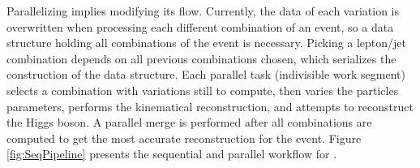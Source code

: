 Parallelizing \ttDilepKinFit implies modifying its flow. Currently, the data of each variation is overwritten when processing each different combination of an event, so a data structure holding all combinations of the event is necessary. Picking a lepton/jet combination depends on all previous combinations chosen, which serializes the construction of the data structure. Each parallel task (indivisible work segment) selects a combination with variations still to compute, then varies the particles parameters, performs the kinematical reconstruction, and attempts to reconstruct the Higgs boson. A parallel merge is performed after all combinations are computed to get the most accurate reconstruction for the event. Figure \ref{fig:SeqPipeline} presents the sequential and parallel workflow for \ttDilepKinFit.

\begin{figure}[!htp]
	\begin{center}

\end{center}
\end{figure}
